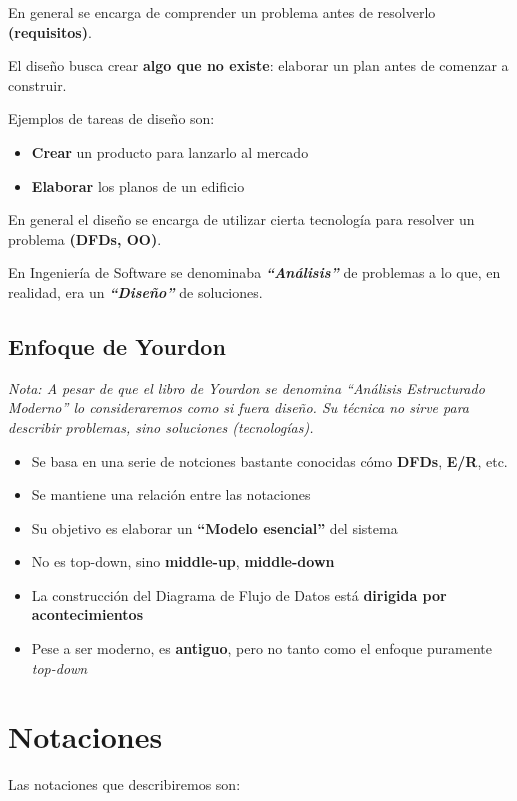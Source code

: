 En general se encarga de comprender un problema antes de resolverlo \textbf{(requisitos)}.

El diseño busca crear \textbf{algo que no existe}: elaborar un plan antes de comenzar a construir.

Ejemplos de tareas de diseño son:

\begin{itemize}[noitemsep]
\item \textbf{Crear} un producto para lanzarlo al mercado
\item \textbf{Elaborar} los planos de un edificio
\end{itemize}

En general el diseño se encarga de utilizar cierta tecnología para resolver un problema \textbf{(DFDs, OO)}.

En Ingeniería de Software se denominaba \textit{\textbf{``Análisis''}} de problemas a lo que, en realidad, era un \textit{\textbf{``Diseño''}} de soluciones.

\subsection{Enfoque de Yourdon}
\textit{Nota: A pesar de que el libro de Yourdon se denomina ``Análisis Estructurado Moderno'' lo consideraremos como si fuera diseño. Su técnica no sirve para describir problemas, sino soluciones (tecnologías).}

\begin{itemize}[noitemsep]
\item Se basa en una serie de notciones bastante conocidas cómo \textbf{DFDs}, \textbf{E/R}, etc.
\item Se mantiene una relación entre las notaciones
\item Su objetivo es elaborar un \textbf{``Modelo esencial''} del sistema
\item No es top-down, sino \textbf{middle-up}, \textbf{middle-down}
\item La construcción del Diagrama de Flujo de Datos está \textbf{dirigida por acontecimientos}
\item Pese a ser moderno, es \textbf{antiguo}, pero no tanto como el enfoque puramente \textit{top-down}
\end{itemize}

\section{Notaciones}
Las notaciones que describiremos son:

